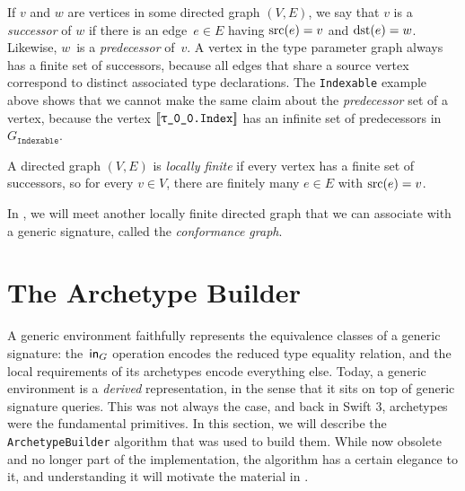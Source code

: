 \documentclass[../generics]{subfiles}
\begin{document}
If $v$ and $w$ are vertices in some directed graph $(V, E)$, we say that $v$ is a \emph{successor} of $w$ if there is an edge~$e\in E$ having $\operatorname{src}(e)=v$ and $\operatorname{dst}(e)=w$. Likewise, $w$~is a \emph{predecessor} of~$v$. A vertex in the type parameter graph always has a finite set of successors, because all edges that share a source vertex correspond to distinct associated type declarations. The \texttt{Indexable} example above shows that we cannot make the same claim about the \emph{predecessor} set of a vertex, because the vertex $\archetype{\rT.Index}$ has an infinite set of predecessors in $G_\texttt{Indexable}$.

\begin{definition}\label{locally finite def}
A directed graph $(V,E)$ is \emph{locally finite} if every vertex has a finite set of successors, so for every $v\in V$, there are finitely many $e\in E$ with $\operatorname{src}(e)=v$.
\end{definition}

In , we will meet another locally finite directed graph that we can associate with a generic signature, called the \emph{conformance graph}.

\section{The Archetype Builder}\label{sec:archetype builder}

A generic environment faithfully represents the equivalence classes of a generic signature: the~$\mathsf{in}_G$ operation encodes the reduced type equality relation, and the local requirements of its archetypes encode everything else. Today, a generic environment is a \emph{derived} representation, in the sense that it sits on top of generic signature queries. This was not always the case, and back in Swift 3, archetypes were the fundamental primitives. In this section, we will describe the \texttt{ArchetypeBuilder} algorithm that was used to build them. While now obsolete and no longer part of the implementation, the algorithm has a certain elegance to it, and understanding it will motivate the material in .
\end{document}
